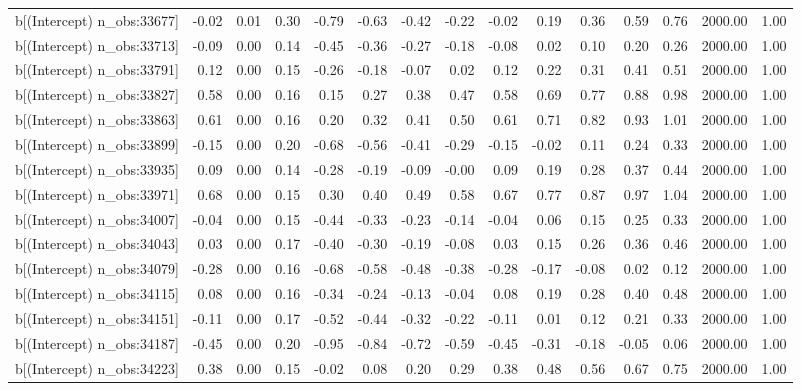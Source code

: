 \begin{table}[ht]
\begin{tabular}{rrrrrrrrrrrrrrr}
  b[(Intercept) n\_obs:33677] & -0.02 & 0.01 & 0.30 & -0.79 & -0.63 & -0.42 & -0.22 & -0.02 & 0.19 & 0.36 & 0.59 & 0.76 & 2000.00 & 1.00 \\ 
  b[(Intercept) n\_obs:33713] & -0.09 & 0.00 & 0.14 & -0.45 & -0.36 & -0.27 & -0.18 & -0.08 & 0.02 & 0.10 & 0.20 & 0.26 & 2000.00 & 1.00 \\ 
  b[(Intercept) n\_obs:33791] & 0.12 & 0.00 & 0.15 & -0.26 & -0.18 & -0.07 & 0.02 & 0.12 & 0.22 & 0.31 & 0.41 & 0.51 & 2000.00 & 1.00 \\ 
  b[(Intercept) n\_obs:33827] & 0.58 & 0.00 & 0.16 & 0.15 & 0.27 & 0.38 & 0.47 & 0.58 & 0.69 & 0.77 & 0.88 & 0.98 & 2000.00 & 1.00 \\ 
  b[(Intercept) n\_obs:33863] & 0.61 & 0.00 & 0.16 & 0.20 & 0.32 & 0.41 & 0.50 & 0.61 & 0.71 & 0.82 & 0.93 & 1.01 & 2000.00 & 1.00 \\ 
  b[(Intercept) n\_obs:33899] & -0.15 & 0.00 & 0.20 & -0.68 & -0.56 & -0.41 & -0.29 & -0.15 & -0.02 & 0.11 & 0.24 & 0.33 & 2000.00 & 1.00 \\ 
  b[(Intercept) n\_obs:33935] & 0.09 & 0.00 & 0.14 & -0.28 & -0.19 & -0.09 & -0.00 & 0.09 & 0.19 & 0.28 & 0.37 & 0.44 & 2000.00 & 1.00 \\ 
  b[(Intercept) n\_obs:33971] & 0.68 & 0.00 & 0.15 & 0.30 & 0.40 & 0.49 & 0.58 & 0.67 & 0.77 & 0.87 & 0.97 & 1.04 & 2000.00 & 1.00 \\ 
  b[(Intercept) n\_obs:34007] & -0.04 & 0.00 & 0.15 & -0.44 & -0.33 & -0.23 & -0.14 & -0.04 & 0.06 & 0.15 & 0.25 & 0.33 & 2000.00 & 1.00 \\ 
  b[(Intercept) n\_obs:34043] & 0.03 & 0.00 & 0.17 & -0.40 & -0.30 & -0.19 & -0.08 & 0.03 & 0.15 & 0.26 & 0.36 & 0.46 & 2000.00 & 1.00 \\ 
  b[(Intercept) n\_obs:34079] & -0.28 & 0.00 & 0.16 & -0.68 & -0.58 & -0.48 & -0.38 & -0.28 & -0.17 & -0.08 & 0.02 & 0.12 & 2000.00 & 1.00 \\ 
  b[(Intercept) n\_obs:34115] & 0.08 & 0.00 & 0.16 & -0.34 & -0.24 & -0.13 & -0.04 & 0.08 & 0.19 & 0.28 & 0.40 & 0.48 & 2000.00 & 1.00 \\ 
  b[(Intercept) n\_obs:34151] & -0.11 & 0.00 & 0.17 & -0.52 & -0.44 & -0.32 & -0.22 & -0.11 & 0.01 & 0.12 & 0.21 & 0.33 & 2000.00 & 1.00 \\ 
  b[(Intercept) n\_obs:34187] & -0.45 & 0.00 & 0.20 & -0.95 & -0.84 & -0.72 & -0.59 & -0.45 & -0.31 & -0.18 & -0.05 & 0.06 & 2000.00 & 1.00 \\ 
  b[(Intercept) n\_obs:34223] & 0.38 & 0.00 & 0.15 & -0.02 & 0.08 & 0.20 & 0.29 & 0.38 & 0.48 & 0.56 & 0.67 & 0.75 & 2000.00 & 1.00 \\ 

\end{tabular}
\end{table}
